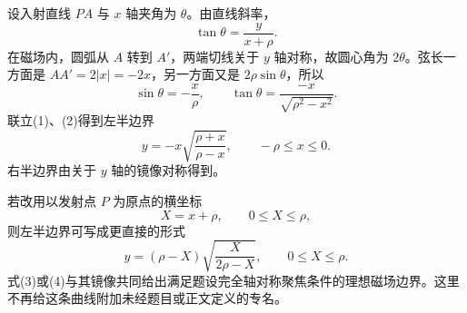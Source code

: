 \begin{solution}
设入射直线 $PA$ 与 $x$ 轴夹角为 $\theta$。由直线斜率，
\[
\tan\theta=\frac{y}{x+\rho}.
\tag{1}
\]
在磁场内，圆弧从 $A$ 转到 $A'$，两端切线关于 $y$ 轴对称，故圆心角为 $2\theta$。弦长一方面是
$AA'=2|x|=-2x$，另一方面又是 $2\rho\sin\theta$，所以
\[
\sin\theta=-\frac{x}{\rho},
\qquad
\tan\theta=\frac{-x}{\sqrt{\rho^2-x^2}}.
\tag{2}
\]
联立(1)、(2)得到左半边界
\[
\boxed{
 y=-x\sqrt{\frac{\rho+x}{\rho-x}},\qquad -\rho\le x\le0 .
}
\tag{3}
\]
右半边界由关于 $y$ 轴的镜像对称得到。

若改用以发射点 $P$ 为原点的横坐标
\[
X=x+\rho,\qquad 0\le X\le\rho,
\]
则左半边界可写成更直接的形式
\[
\boxed{
 y=(\rho-X)\sqrt{\frac{X}{2\rho-X}},\qquad 0\le X\le\rho .
}
\tag{4}
\]
式(3)或(4)与其镜像共同给出满足题设完全轴对称聚焦条件的理想磁场边界。这里不再给这条曲线附加未经题目或正文定义的专名。
\end{solution}

